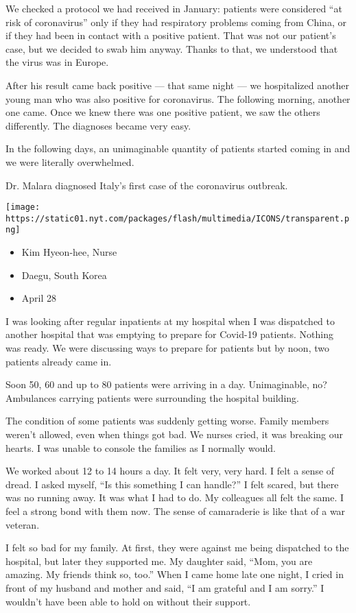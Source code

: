 We checked a protocol we had received in January: patients were
considered ``at risk of coronavirus'' only if they had respiratory
problems coming from China, or if they had been in contact with a
positive patient. That was not our patient's case, but we decided to
swab him anyway. Thanks to that, we understood that the virus was in
Europe.

After his result came back positive --- that same night --- we
hospitalized another young man who was also positive for coronavirus.
The following morning, another one came. Once we knew there was one
positive patient, we saw the others differently. The diagnoses became
very easy.

In the following days, an unimaginable quantity of patients started
coming in and we were literally overwhelmed.

Dr. Malara diagnosed Italy's first case of the coronavirus outbreak.

\texttt{[image: https://static01.nyt.com/packages/flash/multimedia/ICONS/transparent.png]}

\begin{itemize}
\tightlist
\item
  Kim Hyeon-hee, Nurse
\item
  Daegu, South Korea
\item
  April 28
\end{itemize}

I was looking after regular inpatients at my hospital when I was
dispatched to another hospital that was emptying to prepare for Covid-19
patients. Nothing was ready. We were discussing ways to prepare for
patients but by noon, two patients already came in.

Soon 50, 60 and up to 80 patients were arriving in a day. Unimaginable,
no? Ambulances carrying patients were surrounding the hospital building.

The condition of some patients was suddenly getting worse. Family
members weren't allowed, even when things got bad. We nurses cried, it
was breaking our hearts. I was unable to console the families as I
normally would.

We worked about 12 to 14 hours a day. It felt very, very hard. I felt a
sense of dread. I asked myself, ``Is this something I can handle?'' I
felt scared, but there was no running away. It was what I had to do. My
colleagues all felt the same. I feel a strong bond with them now. The
sense of camaraderie is like that of a war veteran.

I felt so bad for my family. At first, they were against me being
dispatched to the hospital, but later they supported me. My daughter
said, ``Mom, you are amazing. My friends think so, too.'' When I came
home late one night, I cried in front of my husband and mother and said,
``I am grateful and I am sorry.'' I wouldn't have been able to hold on
without their support.

